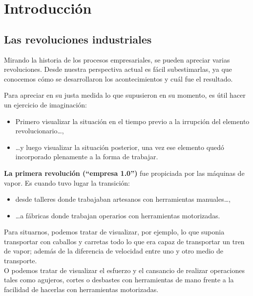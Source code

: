 \documentclass[spanish,12pt,a4paper,final,oneside]{book}
\begin{document}
\chapter{Introducción}

\section{Las revoluciones industriales}

Mirando la historia de los procesos empresariales, se pueden apreciar varias revoluciones. Desde nuestra perspectiva actual es fácil subestimarlas, ya que conocemos cómo se desarrollaron los acontecimientos y cuál fue el resultado.

Para apreciar en su justa medida lo que supusieron en su momento, es útil hacer un ejercicio de imaginación: 
\begin{itemize}
\item Primero visualizar la situación en el tiempo previo a la irrupción del elemento revolucionario\ldots, 
\item \ldots y luego visualizar la situación posterior, una vez ese elemento quedó incorporado plenamente a la forma de trabajar.
\end{itemize}

\vspace{2cm}

\textbf{La primera revolución (``empresa 1.0'')} fue propiciada por las máquinas de vapor. Es cuando tuvo lugar la transición:
\begin{itemize}
\item desde talleres donde trabajaban artesanos con herramientas manuales\ldots, 
\item \ldots a fábricas donde trabajan operarios con herramientas motorizadas.
\end{itemize}
Para situarnos, podemos tratar de visualizar, por ejemplo, lo que suponia transportar con caballos y carretas todo lo que era capaz de transportar un tren de vapor; además de la diferencia de velocidad entre uno y otro medio de transporte.
\\O podemos tratar de visualizar el esfuerzo y el cansancio de realizar operaciones tales como agujeros, cortes o desbastes con herramientas de mano frente a la facilidad de hacerlas con herramientas motorizadas.

\vspace{3cm}
\end{document}
